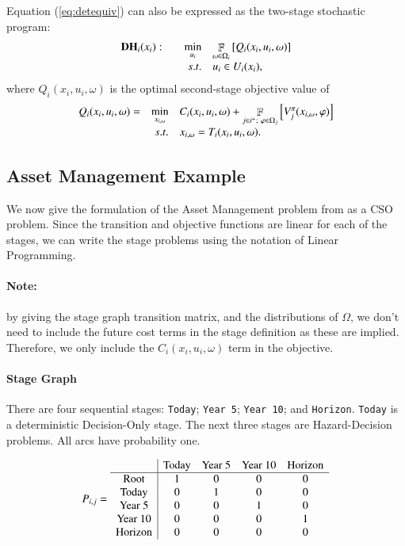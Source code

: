 \documentclass[final,1p,times]{elsarticle}
\DeclareMathOperator*{\F}{\mathbb{F}}
\begin{document}
Equation (\ref{eq:detequiv}) can also be expressed as the two-stage stochastic program:
\begin{equation}
\begin{array}{l r l}
    \textbf{DH}_i(x_i):\quad & \min\limits_{u_i}& \F\limits_{\omega\in\Omega_i}\left[ Q_i(x_i, u_i, \omega)\right]\\
  &{s.t.} & u_{i} \in U_i(x_i),
\end{array}
\end{equation}
where $Q_i(x_i, u_i, \omega)$ is the optimal second-stage objective value of
\begin{equation}
\begin{array}{l r l}
    Q_i(x_i, u_i, \omega) =  & \min\limits_{x_{i,\omega}}& C_i(x_i, u_{i}, \omega) + \F\limits_{j\in i^{+};\ \varphi\in\Omega_j} \left[V^\pi_j(x_{i,\omega}, \varphi)\right]\\
  &{s.t.} & x_{i,\omega} = T_i(x_i, u_{i}, \omega).
\end{array}
\end{equation}

\subsection{Asset Management Example}\label{sec:asset}
We now give the formulation of the Asset Management problem from \cite{birgestoch} as a CSO problem. Since the transition and objective functions are linear for each of the stages, we can write the stage problems using the notation of Linear Programming.

\paragraph{Note:} by giving the stage graph transition matrix, and the distributions of $\Omega$, we don't need to include the future cost terms in the stage definition as these are implied. Therefore, we only include the $C_i(x_i,u_i,\omega)$ term in the objective.

\paragraph{Stage Graph} There are four sequential stages: \texttt{Today}; \texttt{Year 5}; \texttt{Year 10}; and \texttt{Horizon}. \texttt{Today} is a deterministic Decision-Only stage. The next three stages are Hazard-Decision problems. All arcs have probability one.

\begin{equation}
    P_{i,j} = \begin{array}{c | c c c c c}
            & \text{Today} & \text{Year 5} & \text{Year 10} & \text{Horizon}\\
            \hline
        \text{Root} & 1 & 0 & 0 & 0 \\
        \text{Today} & 0 & 1 & 0 & 0 \\
        \text{Year 5} & 0 & 0 & 1 & 0 \\
        \text{Year 10} & 0 & 0 & 0 & 1 \\
        \text{Horizon} & 0 & 0 & 0 & 0
    \end{array}
\end{equation}
\end{document}
